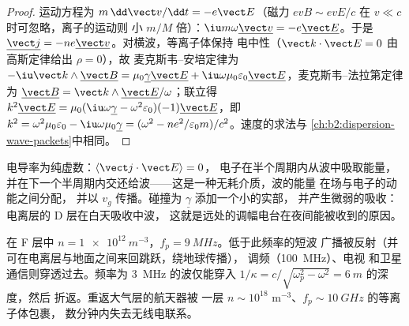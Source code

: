 \begin{proof}
运动方程为 $m\,\dd\vect v/\dd t = -e\vect E$（磁力
$ev B \sim evE/c$ 在 $v \ll c$ 时可忽略，离子的运动则
小 $m/M$ 倍）：$\iu m\omega\underline{\vect v} = -e\underline{\vect E}$。于是
$\underline{\vect j} = -ne\underline{\vect v}$。对横波，等离子体保持
电中性（$\vect k\cdot\vect E = 0$ 由高斯定律给出 $\rho = 0$），故
麦克斯韦–安培定律为 $-\iu\vect k\wedge\underline{\vect B} = \mu_0\underline\gamma\underline{\vect E}
+ \iu\omega\mu_0\varepsilon_0\underline{\vect E}$，麦克斯韦–法拉第定律为 $\underline{\vect B} = \vect k
\wedge\underline{\vect E}/\omega$；联立得 $k^2\underline{\vect E} = \mu_0(\iu\omega\underline\gamma -
\omega^2\varepsilon_0)(-1)\underline{\vect E}$，即 $k^2 = \omega^2\mu_0\varepsilon_0 - \iu\omega\mu_0
\underline\gamma = (\omega^2 - ne^2/\varepsilon_0m)/c^2$。速度的求法与
\cref{ch:b2:dispersion-wave-packets}中相同。
\end{proof}

\begin{remark}[能量去向]\label{rem:b2:waves-in-media:plasmaenergy}
电导率为纯虚数：$\langle\vect j\cdot\vect E\rangle = 0$，
电子在半个周期内从波中吸取能量，
并在下一个半周期内交还给波——这是一种无耗介质，波的能量
在场与电子的动能之间分配，
并以 $v_g$ 传播。碰撞为 $\underline\gamma$ 添加一个小的实部，
并产生微弱的吸收：电离层的 D 层在白天吸收中波，
这就是远处的调幅电台在夜间能被收到的原因。
\end{remark}

\begin{example}[电离层与无线电]\label{ex:b2:waves-in-media:ionosphere}
在 F 层中 $n = \qty{1e12}{m^{-3}}$，$f_p = \qty{9}{MHz}$。低于此频率的短波
广播被反射（并可在电离层与地面之间来回跳跃，绕地球传播），
调频（\qty{100}{MHz}）、电视
和卫星通信则穿透过去。频率为 \qty{3}{MHz} 的波仅能穿入
$1/\kappa = c/\sqrt{\omega_p^2 - \omega^2} = \qty{6}{m}$ 的深度，然后
折返。重返大气层的航天器被
一层 $n \sim 10^{18}$ m$^{-3}$、$f_p \sim \qty{10}{GHz}$ 的等离子体包裹，
数分钟内失去无线电联系。
\end{example}

